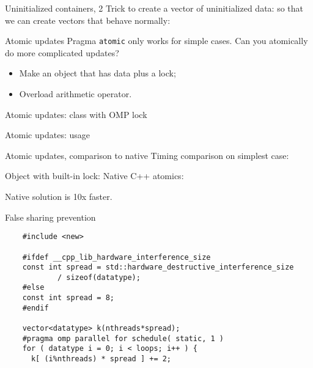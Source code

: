 \documentclass[11pt,headernav]{beamer}
\begin{document}
\begin{numberedframe}{Uninitialized containers, 2}
  Trick to create a vector of uninitialized data:
  so that we can create vectors that behave normally:
\end{numberedframe}

\begin{numberedframe}{Atomic updates}
  Pragma \lstinline{atomic} only works for simple cases.
  Can you atomically do more complicated updates?
  \begin{itemize}
  \item Make an object that has data plus a lock;
  \item Overload arithmetic operator.
  \end{itemize}
\end{numberedframe}

\begin{numberedframe}{Atomic updates: class with OMP lock}
  \begin{multicols}{2}
  \end{multicols}
\end{numberedframe}

\begin{numberedframe}{Atomic updates: usage}
\end{numberedframe}

\begin{numberedframe}{Atomic updates, comparison to native}
  Timing comparison on simplest case:
\begin{multicols}{2}
  Object with built-in lock:
\columnbreak
Native C++ atomics:
\end{multicols}

  Native solution is 10x faster.

\end{numberedframe}

\begin{numberedframe}{False sharing prevention}
  \begin{lstlisting}
    #include <new>

    #ifdef __cpp_lib_hardware_interference_size
    const int spread = std::hardware_destructive_interference_size
            / sizeof(datatype);
    #else
    const int spread = 8;
    #endif

    vector<datatype> k(nthreads*spread);
    #pragma omp parallel for schedule( static, 1 )
    for ( datatype i = 0; i < loops; i++ ) {
      k[ (i%nthreads) * spread ] += 2;
  \end{lstlisting}
\end{numberedframe}
\end{document}
